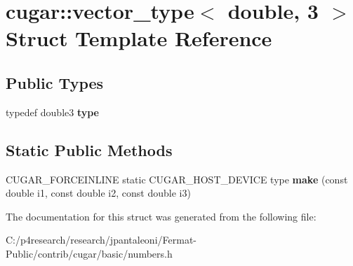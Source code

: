 \hypertarget{structcugar_1_1vector__type_3_01double_00_013_01_4}{}\section{cugar\+:\+:vector\+\_\+type$<$ double, 3 $>$ Struct Template Reference}
\label{structcugar_1_1vector__type_3_01double_00_013_01_4}
\subsection*{Public Types}
\begin{DoxyCompactItemize}
\item 
\mbox{\label{structcugar_1_1vector__type_3_01double_00_013_01_4_a16f54d28f466cd8c02d22bde54345e52}} 
typedef double3 {\bfseries type}
\end{DoxyCompactItemize}
\subsection*{Static Public Methods}
\begin{DoxyCompactItemize}
\item 
\mbox{\label{structcugar_1_1vector__type_3_01double_00_013_01_4_ab1fdf174fc3e677604c06403f0dfd785}} 
C\+U\+G\+A\+R\+\_\+\+F\+O\+R\+C\+E\+I\+N\+L\+I\+NE static C\+U\+G\+A\+R\+\_\+\+H\+O\+S\+T\+\_\+\+D\+E\+V\+I\+CE type {\bfseries make} (const double i1, const double i2, const double i3)
\end{DoxyCompactItemize}


The documentation for this struct was generated from the following file\+:\begin{DoxyCompactItemize}
\item 
C\+:/p4research/research/jpantaleoni/\+Fermat-\/\+Public/contrib/cugar/basic/numbers.\+h\end{DoxyCompactItemize}
